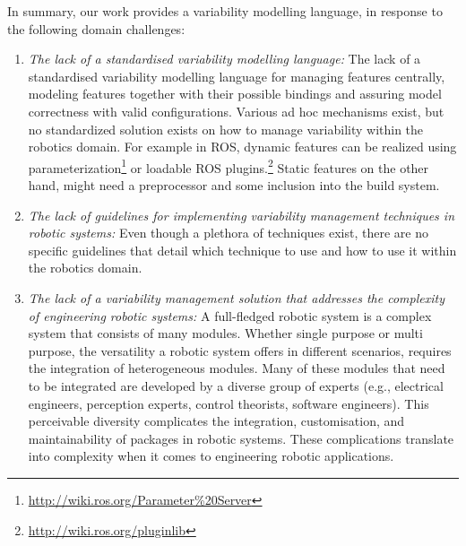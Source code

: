 \documentclass[conference]{IEEEtran}
\newcommand{\foot}[1]{\footnote{\url{#1}}}
\begin{document}
In summary, our work provides a variability modelling language, in response to the following domain challenges:
\begin{enumerate}
    \item \textit{The lack of a standardised variability modelling language: }The lack of a standardised variability modelling language for managing features centrally, modeling features together with their possible bindings and assuring model correctness with valid configurations. Various ad hoc mechanisms exist, but no standardized solution exists on how to manage variability within the robotics domain. For example in ROS, dynamic features can be realized using parameterization\foot{http://wiki.ros.org/Parameter\%20Server} or loadable ROS plugins.\foot{http://wiki.ros.org/pluginlib} Static features on the other hand, might need a preprocessor and some inclusion into the build system.
    
    \item \textit{The lack of guidelines for implementing variability management techniques in robotic systems:} Even though a plethora of techniques exist, there are no specific guidelines that detail which technique to use and how to use it within the robotics domain.
    
    \item \textit{The lack of a variability management solution that addresses the complexity of engineering robotic systems: }A full-fledged robotic system is a complex system that consists of many modules. Whether single purpose or multi purpose, the versatility a robotic system offers in different scenarios, requires the integration of heterogeneous modules. Many of these modules that need to be integrated are developed by a diverse group of experts (e.g., electrical engineers, perception experts, control theorists, software engineers). This perceivable diversity complicates the integration, customisation, and maintainability of packages in robotic systems. These complications translate into complexity when it comes to engineering robotic applications.
\end{enumerate}
\end{document}
